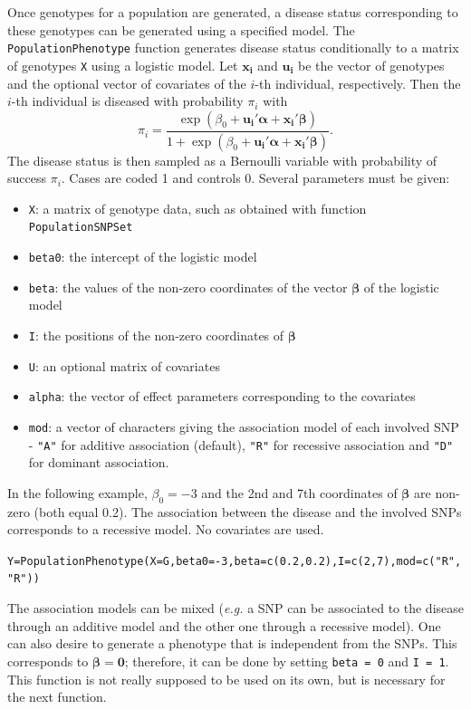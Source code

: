 \documentclass[12pt]{article}
\begin{document}
 	Once genotypes for a population are generated, a disease status corresponding to these genotypes can be generated using a specified model. The \texttt{PopulationPhenotype} function generates disease status conditionally to a matrix of genotypes \texttt{X} using a logistic model. Let $\bm{x_{i}}$ and $\bm{u_{i}}$ be the vector of genotypes and the optional vector of covariates of the $i$-th individual, respectively. Then the $i$-th individual is diseased with probability $\pi_{i}$ with
 	\begin{equation*}
 	\pi_{i} = \frac{\exp(\beta_{0}+\bm{u_{i}}'\bm{\alpha}+\bm{x_{i}}'\bm{\beta})}{1+\exp(\beta_{0}+\bm{u_{i}}'\bm{\alpha}+\bm{x_{i}}'\bm{\beta})}.
 	\end{equation*}
 	The disease status is then sampled as a Bernoulli variable with probability of success $\pi_{i}$. Cases are coded 1 and controls 0. Several parameters must be given:
 	\begin{itemize}
 		\item \texttt{X}: a matrix of genotype data, such as obtained with function \texttt{PopulationSNPSet}
 		\item \texttt{beta0}: the intercept of the logistic model
 		\item \texttt{beta}: the values of the non-zero coordinates of the vector $\bm{\beta}$ of the logistic model
 		\item \texttt{I}: the positions of the non-zero coordinates of $\bm{\beta}$
 		\item \texttt{U}: an optional matrix of covariates
 		\item \texttt{alpha}: the vector of effect parameters corresponding to the covariates
 		\item \texttt{mod}: a vector of characters giving the association model of each involved SNP - \texttt{"A"} for additive association (default), \texttt{"R"} for recessive association and \texttt{"D"} for dominant association.
 	\end{itemize}
 	In the following example, $\beta_{0} = -3$ and the 2nd and 7th coordinates of $\bm{\beta}$ are non-zero (both equal 0.2). The association between the disease and the involved SNPs corresponds to a recessive model. No covariates are used.

 	\begin{alltt}
Y = PopulationPhenotype(X=G,beta0=-3,beta=c(0.2,0.2),I=c(2,7),mod=c("R","R"))
 	\end{alltt}

	\noindent The association models can be mixed (\emph{e.g.} a SNP can be associated to the disease through an additive model and the other one through a recessive model). One can also desire to generate a phenotype that is independent from the SNPs. This corresponds to $\bm{\beta} = \bm{0}$; therefore, it can be done by setting \texttt{beta = 0} and \texttt{I = 1}. This function is not really supposed to be used on its own, but is necessary for the next function.
\end{document}
